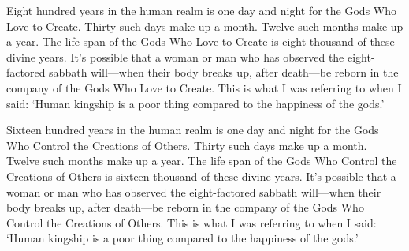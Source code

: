 \documentclass[12pt,openany]{book}%
\begin{document}
Eight hundred years in the human realm is one day and night for the Gods Who Love to Create. Thirty such days make up a month. Twelve such months make up a year. The life span of the Gods Who Love to Create is eight thousand of these divine years. It’s possible that a woman or man who has observed the eight-factored sabbath will—when their body breaks up, after death—be reborn in the company of the Gods Who Love to Create. This is what I was referring to when I said: ‘Human kingship is a poor thing compared to the happiness of the gods.’ 

Sixteen hundred years in the human realm is one day and night for the Gods Who Control the Creations of Others. Thirty such days make up a month. Twelve such months make up a year. The life span of the Gods Who Control the Creations of Others is sixteen thousand of these divine years. It’s possible that a woman or man who has observed the eight-factored sabbath will—when their body breaks up, after death—be reborn in the company of the Gods Who Control the Creations of Others. This is what I was referring to when I said: ‘Human kingship is a poor thing compared to the happiness of the gods.’ 
\end{document}

